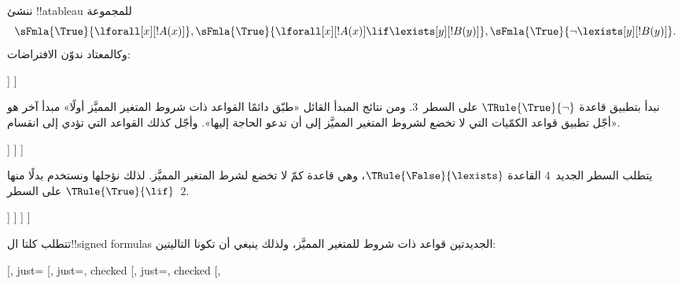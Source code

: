\documentclass[../../../include/open-logic-section]{subfiles}
\begin{document}
\begin{ex}
ننشئ !!a{tableau} للمجموعة
\[
\sFmla{\True}{\lforall[x][!A(x)]}, \sFmla{\True}{\lforall[x][!A(x)] 
  \lif \lexists[y][!B(y)]}, \sFmla{\True}{\lnot\lexists[y][!B(y)]}.
\]
وكالمعتاد ندوّن الافتراضات:
\begin{oltableau}
  [\sFmla{\True}{\lforall[x][\formula{A}(x)]}, just=\TAss
    [\sFmla{\True}{\lforall[x][\formula{A}(x)] \lif
        \lexists[y][\formula{B}(y)]}, just=\TAss
      [\sFmla{\True}{\lnot\lexists[y][\formula{B}(y)]}, just=\TAss
      ]
    ]
  ]
\end{oltableau}
نبدأ بتطبيق قاعدة $\TRule{\True}{\lnot}$ على السطر~$3$. ومن نتائج المبدأ
القائل «طبّق دائمًا القواعد ذات شروط المتغير المميَّز أولًا» مبدأ آخر هو
«أجّل تطبيق قواعد الكمّيات التي لا تخضع لشروط المتغير المميَّز إلى أن تدعو
الحاجة إليها». وأجّل كذلك القواعد التي تؤدي إلى انقسام.
\begin{oltableau}
  [\sFmla{\True}{\lforall[x][\formula{A}(x)]}, just=\TAss
    [\sFmla{\True}{\lforall[x][\formula{A}(x)] \lif
        \lexists[y][\formula{B}(y)]}, just=\TAss
      [\sFmla{\True}{\lnot\lexists[y][\formula{B}(y)]}, just=\TAss, checked
        [\sFmla{\False}{\lexists[y][\formula{B}(y)]}, just={\TRule{\True}{\lnot}[3]}]
      ]
    ]
  ]
\end{oltableau}
يتطلب السطر الجديد~$4$ القاعدة $\TRule{\False}{\lexists}$، وهي قاعدة كمّ
لا تخضع لشرط المتغير المميَّز. لذلك نؤجلها ونستخدم بدلًا منها
$\TRule{\True}{\lif}$ على السطر~$2$.
\begin{oltableau}
  [\sFmla{\True}{\lforall[x][\formula{A}(x)]}, just=\TAss
    [\sFmla{\True}{\lforall[x][\formula{A}(x)] \lif
        \lexists[y][\formula{B}(y)]}, just=\TAss, checked
      [\sFmla{\True}{\lnot\lexists[y][\formula{B}(y)]}, just=\TAss, checked
        [\sFmla{\False}{\lexists[y][\formula{B}(y)]},
          just={\TRule{\True}{\lnot}[3]},
          [\sFmla{\False}{\lforall[x][\formula{A}(x)]}, just={\TRule{\True}{\lif}[2]}]
          [\sFmla{\True}{\lexists[y][\formula{B}(y)]}, just={\TRule{\True}{\lif}[2]}]
        ]
      ]
    ]
  ]
\end{oltableau}
تتطلب كلتا ال!!{signed formula}s الجديدتين قواعد ذات شروط للمتغير المميَّز،
ولذلك ينبغي أن تكونا التاليتين:
\begin{oltableau}
  [\sFmla{\True}{\lforall[x][\formula{A}(x)]}, just=\TAss
    [\sFmla{\True}{\lforall[x][\formula{A}(x)] \lif
        \lexists[y][\formula{B}(y)]}, just=\TAss, checked
      [\sFmla{\True}{\lnot\lexists[y][\formula{B}(y)]}, just=\TAss, checked
        [\sFmla{\False}{\lexists[y][\formula{B}(y)]},

\end{oltableau}
\end{ex}
\end{document}
